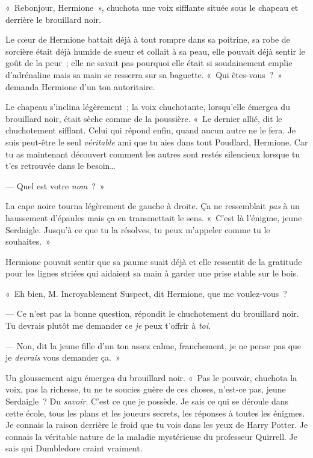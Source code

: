 «~Rebonjour, Hermione~», chuchota une voix sifflante située sous le chapeau et derrière le brouillard noir.

Le cœur de Hermione battait déjà à tout rompre dans sa poitrine, sa robe de sorcière était déjà humide de sueur et collait à sa peau, elle pouvait déjà sentir le goût de la peur~; elle ne savait pas pourquoi elle était si soudainement emplie d'adrénaline mais sa main se resserra sur sa baguette.
«~Qui êtes-vous~?~»
demanda Hermione d'un ton autoritaire.

Le chapeau s'inclina légèrement~; la voix chuchotante, lorsqu'elle émergea du brouillard noir, était sèche comme de la poussière.
«~Le dernier allié, dit le chuchotement sifflant.
Celui qui répond enfin, quand aucun autre ne le fera.
Je suis peut-être le seul \emph{véritable} ami que tu aies dans tout Poudlard, Hermione.
Car tu as maintenant découvert comment les autres sont restés silencieux lorsque tu t'es retrouvée dans le besoin…

--- Quel est votre \emph{nom}~?~»

La cape noire tourna légèrement de gauche à droite.
Ça ne ressemblait \emph{pas} à un haussement d'épaules mais ça en transmettait le sens.
«~C'est là l'énigme, jeune Serdaigle.
Jusqu'à ce que tu la résolves, tu peux m'appeler comme tu le souhaites.~»

Hermione pouvait sentir que sa paume suait déjà et elle ressentit de la gratitude pour les lignes striées qui aidaient sa main à garder une prise stable sur le bois.

«~Eh bien, M. Incroyablement Suspect, dit Hermione, que me voulez-vous~?

--- Ce n'est pas la bonne question, répondit le chuchotement du brouillard noir.
Tu devrais plutôt me demander ce \emph{je} peux t'offrir à \emph{toi}.

--- Non, dit la jeune fille d'un ton assez calme, franchement, je ne pense pas que je \emph{devrais} vous demander ça.~»

Un gloussement aigu émergea du brouillard noir.
«~Pas le pouvoir, chuchota la voix, pas la richesse, tu ne te soucies guère de ces choses, n'est-ce pas, jeune Serdaigle~?
Du \emph{savoir}.
C'est ce que je possède.
Je sais ce qui se déroule dans cette école, tous les plans et les joueurs secrets, les réponses à toutes les énigmes.
Je connais la raison derrière le froid que tu vois dans les yeux de Harry Potter.
Je connais la véritable nature de la maladie mystérieuse du professeur Quirrell.
Je sais qui Dumbledore craint vraiment.

